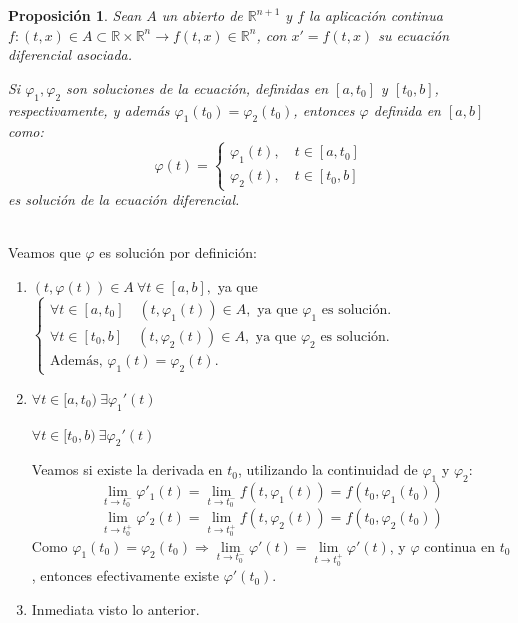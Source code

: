 \documentclass[11pt, a4paper,twoside]{article}
\makeatletter
\theoremstyle{theorem-style}  %
\newtheorem{proposition}[theorem]{Proposición}
\renewenvironment{proof}[1][\proofname]{\par
	\pushQED{\qed}%
	\normalfont \topsep6\p@\@plus6\p@\relax
	\list{}{%
		\settowidth{\leftmargin}{\quad:\hskip\labelsep}%
		\setlength{\labelwidth}{0pt}%
		\setlength{\itemindent}{-\leftmargin}%
	}%
	\item[\hskip\labelsep\itshape#1\@addpunct{:}]\ignorespaces
}{%
	\popQED\endlist\@endpefalse
}
\theoremstyle{definition-style}
\theoremstyle{example-style}
\makeatother
\begin{document}
\begin{proposition}
	Sean $ A $ un abierto de $ \mathbb{R}^{n+1} $ y $ f $ la aplicación continua $ f:(t,x)\in A\subset \mathbb{R}\times \mathbb{R}^n \longrightarrow f(t,x)\in \mathbb{R}^n $, con $  x'=f(t,x) $ su ecuación diferencial asociada. 
	
	Si $ \varphi_1, \varphi_2 $ son soluciones de la ecuación, definidas en $ [a, t_0]$ y $ [t_0,b] $, respectivamente, y además $ \varphi_1(t_0)=\varphi_2(t_0) $, entonces $ \varphi $ definida en $ [a,b] $ como:
	\[ \varphi(t)=\begin{cases}
	\varphi_1(t), \quad t\in [a,t_0]\\
	\varphi_2(t), \quad t\in [t_0,b]
	\end{cases} \]
	es solución de la ecuación diferencial.
\end{proposition}
\begin{proof}\ \\
	Veamos que $ \varphi $ es solución por definición:
	\begin{enumerate}[\quad i)]
		\item $ (t,\varphi(t))\in A \ \forall t \in [a,b], $ ya que $ \begin{cases}
		\forall t\in [a,t_0] \quad (t, \varphi_1(t)) \in A, \text{ ya que }\varphi_1 \text{ es solución.}\\
		\forall t\in [t_0,b] \quad (t, \varphi_2(t)) \in A, \text{ ya que }\varphi_2 \text{ es solución.}\\
		\text{Además, } \varphi_1(t)=\varphi_2(t).
		\end{cases}$
		\item $ \forall t \in [a,t_0) \ \exists \varphi_1'(t)$
		
		$ \forall t \in [t_0,b) \ \exists \varphi_2'(t) $
		
		Veamos si existe la derivada en $ t_0 $, utilizando la continuidad de $ \varphi_1 $ y $ \varphi_2 $:
		\[ \lim\limits_{t \to t_0^-} \varphi'_1(t)=\lim\limits_{t \to t_0^-} f(t, \varphi_1(t))=f(t_0,\varphi_1(t_0)) \]
		\[ \lim\limits_{t \to t_0^+} \varphi'_2(t)=\lim\limits_{t \to t_0^+} f(t, \varphi_2(t))=f(t_0,\varphi_2(t_0)) \]
		Como $ \varphi_1(t_0)=\varphi_2(t_0) \Rightarrow \lim\limits_{t \to t_0^-} \varphi'(t)=\lim\limits_{t \to t_0^+} \varphi'(t)$, y $\varphi $ continua en $ t_0 $, entonces efectivamente existe $ \varphi'(t_0) $.
		\item Inmediata visto lo anterior.
	\end{enumerate} 
\end{proof}
\end{document}
